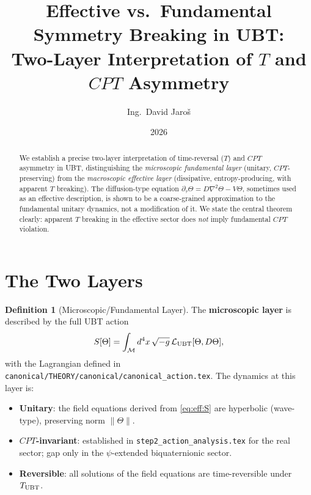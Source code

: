 \documentclass[12pt,a4paper]{article}
\title{\textbf{Effective vs.\ Fundamental Symmetry Breaking in UBT:\\
                 Two-Layer Interpretation of $T$ and $CPT$ Asymmetry}}
\author{Ing.\ David Jaro\v{s}}
\date{2026}
\theoremstyle{definition}
\newtheorem{definition}[theorem]{Definition}
\theoremstyle{remark}
\begin{document}
  \maketitle

  \begin{abstract}
  We establish a precise two-layer interpretation of time-reversal ($T$) and
  $CPT$ asymmetry in UBT, distinguishing the \emph{microscopic fundamental layer}
  (unitary, $CPT$-preserving) from the \emph{macroscopic effective layer}
  (dissipative, entropy-producing, with apparent $T$ breaking).
  The diffusion-type equation $\partial_\tau\Theta = D\nabla^2\Theta - V\Theta$,
  sometimes used as an effective description, is shown to be a coarse-grained
  approximation to the fundamental unitary dynamics, not a modification of it.
  We state the central theorem clearly: apparent $T$ breaking in the effective
  sector does \emph{not} imply fundamental $CPT$ violation.
  \end{abstract}
\fi

\section{The Two Layers}
\label{sec:eff:layers}

\begin{definition}[Microscopic/Fundamental Layer]
\label{def:eff:micro}
The \textbf{microscopic layer} is described by the full UBT action
\begin{equation}
  S[\Theta] = \int_\mathcal{M} d^4x\,\sqrt{-g}\,\mathcal{L}_{\rm UBT}[\Theta, D\Theta],
  \label{eq:eff:S}
\end{equation}
with the Lagrangian defined in \texttt{canonical/THEORY/canonical/canonical\_action.tex}.
The dynamics at this layer is:
\begin{itemize}
  \item \textbf{Unitary}: the field equations derived from \eqref{eq:eff:S}
    are hyperbolic (wave-type), preserving norm $\|\Theta\|$.
  \item \textbf{$CPT$-invariant}: established in \texttt{step2\_action\_analysis.tex}
    for the real sector; gap only in the $\psi$-extended biquaternionic sector.
  \item \textbf{Reversible}: all solutions of the field equations are time-reversible
    under $T_{\rm UBT}$.
\end{itemize}
\end{definition}
\end{document}
